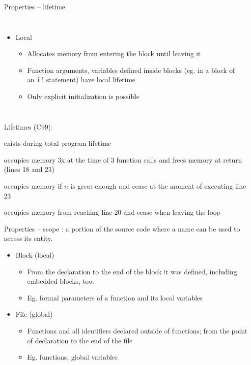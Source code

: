 \documentclass[usenames,dvipsnames,aspectratio=169]{beamer}
\begin{document}
\begin{frame}{Properties -- lifetime}
  \begin{columns}[T]
      \begin{itemize}
      \small
      \item Local
      \begin{itemize}
        \item Allocates memory from entering the block until leaving it
        \item Function arguments, variables defined inside blocks (eg. in a block of an \texttt{if} statement) have local lifetime
        \item Only explicit initialization is possible
      \end{itemize}
    \end{itemize}
      \begin{exampleblock}{}
        \tiny
        
      \end{exampleblock}
  \end{columns}
  \vfill
  \scriptsize
  Lifetimes (C99):
  \begin{description}[]
    \item[factorial] exists during total program lifetime
    \item[$n$] occupies memory 3x at the time of 3 function calls and frees memory at return (lines 18 and 23)
    \item[$f$] occupies memory if $n$ is great enough and cease at the moment of executing line 23
    \item[$i$] occupies memory from reaching line 20 and cease when leaving the loop
  \end{description}
\end{frame}

\begin{frame}{Properties -- scope}
  : a portion of the source code where a name can be used to access its entity.
  \begin{itemize}
    \item Block (local)
    \begin{itemize}
      \item From the declaration to the end of the block it was defined, including embedded blocks, too.
      \item Eg. formal parameters of a function and its local variables
    \end{itemize}
    \item File (global)
    \begin{itemize}
      \item Functions and all identifiers declared outside of functions; from the point of declaration to the end of the file
      \item Eg. functions, global variables
    \end{itemize}
  \end{itemize}
\end{frame}
\end{document}
